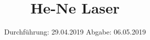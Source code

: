 

\subject{V61}
\title{He-Ne Laser}
\date{%
  Durchführung: 29.04.2019
  \hspace{3em}
  Abgabe: 06.05.2019
}



\maketitle
\thispagestyle{empty}
\tableofcontents
\newpage






\printbibliography{}



